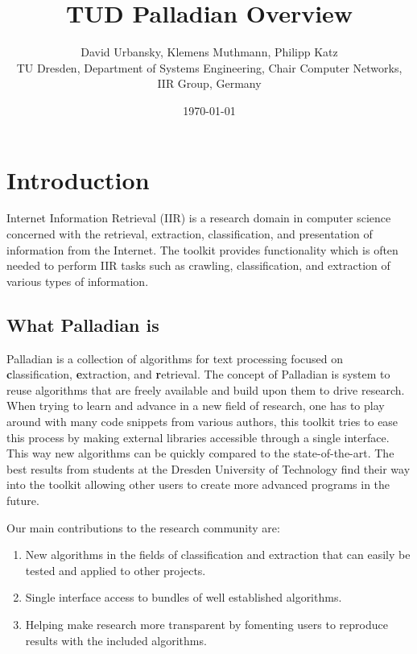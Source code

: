 \documentclass[a4paper,twoside]{book}      %
\date{\today}
\title{TUD Palladian Overview}
\author{David Urbansky, Klemens Muthmann, Philipp Katz \\
{\small TU Dresden, Department of Systems Engineering, Chair Computer Networks, IIR Group, Germany}
}
\begin{document}
\maketitle

\tableofcontents

\chapter{Introduction}
Internet Information Retrieval (IIR) is a research domain in computer science concerned with the retrieval, extraction, classification, and presentation of information from the Internet. The toolkit provides functionality which is often needed to perform IIR tasks such as crawling, classification, and extraction of various types of information.

\section{What Palladian is}
Palladian is a collection of algorithms for text processing focused on {\textbf classification}, {\textbf extraction}, and {\textbf retrieval}. The concept of Palladian is system to reuse algorithms that are freely available and build upon them to drive research. When trying to learn and advance in a new field of research, one has to play around with many code snippets from various authors, this toolkit tries to ease this process by making external libraries accessible through a single interface. This way new algorithms can be quickly compared to the state-of-the-art.
The best results from students at the Dresden University of Technology find their way into the toolkit allowing other users to create more advanced programs in the future.

Our main contributions to the research community are:
\begin{enumerate}
\item New algorithms in the fields of classification and extraction that can easily be tested and applied to other projects.
\item Single interface access to bundles of well established algorithms.
\item Helping make research more transparent by fomenting users to reproduce results with the included algorithms.
\end{enumerate}
\end{document}
